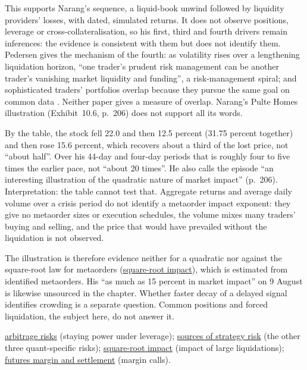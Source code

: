 \begin{qfdefinition}
This supports Narang's sequence, a liquid-book unwind followed by liquidity providers' losses, with dated, simulated returns. It does not observe positions, leverage or cross-collateralisation, so his first, third and fourth drivers remain inferences: the evidence is consistent with them but does not identify them. Pedersen gives the mechanism of the fourth: as volatility rises over a lengthening liquidation horizon, ``one trader's prudent risk management can be another trader's vanishing market liquidity and funding'', a risk-management spiral; and sophisticated traders' portfolios overlap because they pursue the same goal on common data \citep[NBER WP~15297, August 2009, secs.~2.2 and~3.2, PDF pp.~8 and~15]{wide-pedersen-exit}. Neither paper gives a measure of overlap. Narang's Pulte Homes illustration (Exhibit~10.6, p.~206) does not support all its words.

By the table, the stock fell 22.0 and then 12.5 percent (31.75 percent together) and then rose 15.6 percent, which recovers about a third of the lost price, not ``about half''. Over his 44-day and four-day periods that is roughly four to five times the earlier pace, not ``about 20 times''. He also calls the episode ``an interesting illustration of the quadratic nature of market impact'' (p.~206). Interpretation: the table cannot test that. Aggregate returns and average daily volume over a crisis period do not identify a metaorder impact exponent: they give no metaorder sizes or execution schedules, the volume mixes many traders' buying and selling, and the price that would have prevailed without the liquidation is not observed.

The illustration is therefore evidence neither for a quadratic nor against the square-root law for metaorders (\hyperref[ev:square-root-impact]{square-root impact}), which is estimated from identified metaorders. His ``as much as 15 percent in market impact'' on 9 August is likewise unsourced in the chapter. Whether faster decay of a delayed signal identifies crowding is a separate question. Common positions and forced liquidation, the subject here, do not answer it.

 \hyperref[res:arbitrage-risks]{arbitrage risks} (staying power under leverage); \hyperref[def:quant-strategy-risk-sources]{sources of strategy risk} (the other three quant-specific risks); \hyperref[ev:square-root-impact]{square-root impact} (impact of large liquidations); \hyperref[mech:futures-margin-settlement]{futures margin and settlement} (margin calls).

\end{qfdefinition}

